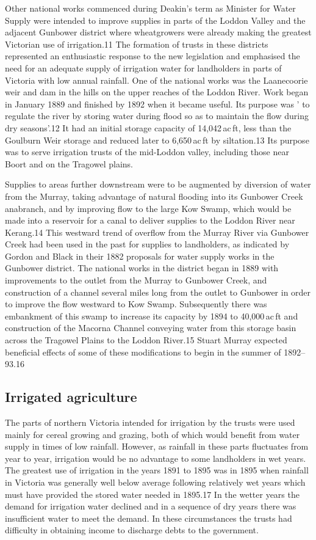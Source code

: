 Other national works commenced during Deakin's term as Minister for
Water Supply were intended to improve supplies in parts of the Loddon
Valley and the adjacent Gunbower district where wheatgrowers were
already making the greatest Victorian use of irrigation.11 The
formation of trusts in these districts represented an enthusiastic
response to the new legislation and emphasised the need for an
adequate supply of irrigation water for landholders in parts of
Victoria with low annual rainfall. One of the national works was the
Laanecoorie weir and dam in the hills on the upper reaches of the
Loddon River. Work began in January 1889 and finished by 1892 when it
became useful. Its purpose was ' to regulate the river by storing
water during flood so as to maintain the flow during dry seasons'.12
It had an initial storage capacity of 14,042\,ac\,ft, less than the
Goulburn Weir storage and reduced later to 6,650\,ac\,ft by
siltation.13 Its purpose was to serve irrigation trusts of the
mid-Loddon valley, including those near Boort and on the Tragowel
plains.

Supplies to areas further downstream were to be augmented by diversion
of water from the Murray, taking advantage of natural flooding into
its Gunbower Creek anabranch, and by improving flow to the large Kow
Swamp, which would be made into a reservoir for a canal to deliver
supplies to the Loddon River near Kerang.14 This westward trend of
overflow from the Murray River via Gunbower Creek had been used in the
past for supplies to landholders, as indicated by Gordon and Black in
their 1882 proposals for water supply works in the Gunbower
district. The national works in the district began in 1889 with
improvements to the outlet from the Murray to Gunbower Creek, and
construction of a channel several miles long from the outlet to
Gunbower in order to improve the flow westward to Kow
Swamp. Subsequently there was embankment of this swamp to increase its
capacity by 1894 to 40,000\,ac\,ft and construction of the Macorna
Channel conveying water from this storage basin across the Tragowel
Plains to the Loddon River.15 Stuart Murray expected beneficial
effects of some of these modifications to begin in the summer of
1892--93.16

\subsection{Irrigated agriculture}

The parts of northern Victoria intended for irrigation by the trusts
were used mainly for cereal growing and grazing, both of which would
benefit from water supply in times of low rainfall. However, as
rainfall in these parts fluctuates from year to year, irrigation would
be no advantage to some landholders in wet years. The greatest use of
irrigation in the years 1891 to 1895 was in 1895 when rainfall in
Victoria was generally well below average following relatively wet
years which must have provided the stored water needed in 1895.17 In
the wetter years the demand for irrigation water declined and in a
sequence of dry years there was insufficient water to meet the
demand. In these circumstances the trusts had difficulty in obtaining
income to discharge debts to the government.

